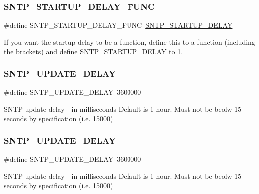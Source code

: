 \subsubsection{\texorpdfstring{S\+N\+T\+P\+\_\+\+S\+T\+A\+R\+T\+U\+P\+\_\+\+D\+E\+L\+A\+Y\+\_\+\+F\+U\+NC}{SNTP\_STARTUP\_DELAY\_FUNC}\hspace{0.1cm}{\footnotesize\ttfamily [2/2]}}
{\footnotesize\ttfamily \#define S\+N\+T\+P\+\_\+\+S\+T\+A\+R\+T\+U\+P\+\_\+\+D\+E\+L\+A\+Y\+\_\+\+F\+U\+NC~\hyperlink{group__sntp__opts_ga22017d43da7d4bf8d42e786b4ced4dfa}{S\+N\+T\+P\+\_\+\+S\+T\+A\+R\+T\+U\+P\+\_\+\+D\+E\+L\+AY}}

If you want the startup delay to be a function, define this to a function (including the brackets) and define S\+N\+T\+P\+\_\+\+S\+T\+A\+R\+T\+U\+P\+\_\+\+D\+E\+L\+AY to 1. \mbox{\label{group__sntp__opts_ga9232c56443115be05a2f852eba21979c}} 
\subsubsection{\texorpdfstring{S\+N\+T\+P\+\_\+\+U\+P\+D\+A\+T\+E\+\_\+\+D\+E\+L\+AY}{SNTP\_UPDATE\_DELAY}\hspace{0.1cm}{\footnotesize\ttfamily [1/2]}}
{\footnotesize\ttfamily \#define S\+N\+T\+P\+\_\+\+U\+P\+D\+A\+T\+E\+\_\+\+D\+E\+L\+AY~3600000}

S\+N\+TP update delay -\/ in milliseconds Default is 1 hour. Must not be beolw 15 seconds by specification (i.\+e. 15000) \mbox{\label{group__sntp__opts_ga9232c56443115be05a2f852eba21979c}} 
\subsubsection{\texorpdfstring{S\+N\+T\+P\+\_\+\+U\+P\+D\+A\+T\+E\+\_\+\+D\+E\+L\+AY}{SNTP\_UPDATE\_DELAY}\hspace{0.1cm}{\footnotesize\ttfamily [2/2]}}
{\footnotesize\ttfamily \#define S\+N\+T\+P\+\_\+\+U\+P\+D\+A\+T\+E\+\_\+\+D\+E\+L\+AY~3600000}

S\+N\+TP update delay -\/ in milliseconds Default is 1 hour. Must not be beolw 15 seconds by specification (i.\+e. 15000) 